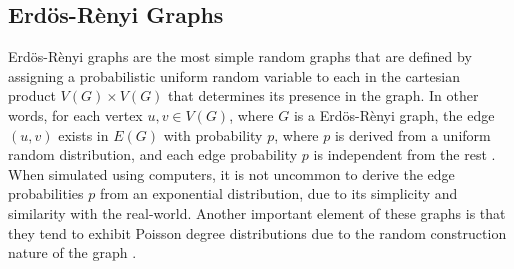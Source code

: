 \documentclass[doc]{apa}%
\begin{document}

\subsection{Erd\"{o}s-R\`{e}nyi Graphs}
Erd\"{o}s-R\`{e}nyi graphs are the most simple random graphs that are defined by assigning a probabilistic uniform random variable to each in the cartesian product $V(G) \times V(G)$ that determines its presence in the graph. In other words, for each vertex $u, v \in V(G)$, where $G$ is a Erd\"{o}s-R\`{e}nyi graph, the edge $(u,v)$ exists in $E(G)$ with probability $p$, where $p$ is derived from a uniform random distribution, and each edge probability $p$ is independent from the rest \cite{LargeNetworkRobustnessPVM}. When simulated using computers, it is not uncommon to derive the edge probabilities $p$ from an exponential distribution, due to its simplicity and similarity with the real-world. Another important element of these graphs is that they tend to exhibit Poisson degree distributions due to the random construction nature of the graph \cite{bimodal}.
\end{document}
